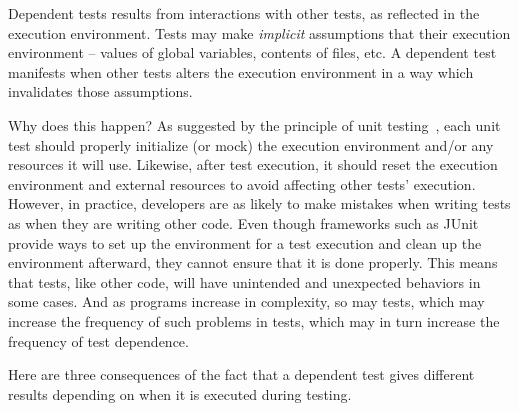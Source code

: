 
Dependent tests results from interactions with other tests,
as reflected in the execution environment.
Tests may make \textit{implicit} assumptions that their
execution environment -- values of global variables,
contents of files, etc. A dependent test
manifests when other tests alters the execution
environment in a way which invalidates those assumptions.


Why does this happen? As
suggested by the principle of unit testing~\cite{Greiler:2013:SAT, Massol:2003}, each unit
test should properly initialize (or mock) the execution environment
and/or any resources it will use.
Likewise, after test execution, it should reset the
execution environment and external resources
to avoid affecting other tests' execution.
However, in practice,
developers are as likely
to make mistakes when writing tests as when they are writing other code.
Even though frameworks such as
JUnit provide ways to set up the environment for a test execution and clean
up the environment afterward,
they cannot ensure that it is done
properly. This means that tests, like other code,
will have unintended and unexpected behaviors in some cases. And
as programs increase in complexity, so may tests, which may
increase the frequency of such problems in tests, which may
in turn increase the frequency of test dependence.



%
%




Here are three consequences of the fact that a dependent
test gives different results depending on when it is executed
during testing.

